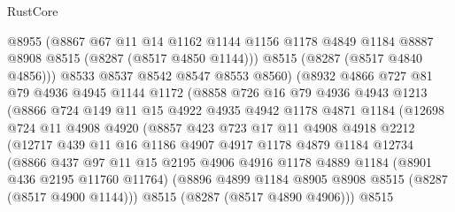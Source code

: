 \begin{lexlean}{RustCore}
\begin{coremodule}
                  @8955
                  (@8867
                    @67
                    @11
                    @14
                    @1162
                    @1144
                    @1156
                    @1178
                    @4849
                    @1184
                    @8887
                    @8908
                    @8515
                    (@8287 (@8517 @4850 @1144)))
                  @8515
                  (@8287 (@8517 @4840 @4856)))
                @8533
                @8537
                @8542
                @8547
                @8553
                @8560)
              (@8932
                @4866
                @727
                @81
                @79
                @4936
                @4945
                @1144
                @1172
                (@8858
                  @726
                  @16
                  @79
                  @4936
                  @4943
                  @1213
                  (@8866
                    @724
                    @149
                    @11
                    @15
                    @4922
                    @4935
                    @4942
                    @1178
                    @4871
                    @1184
                    (@12698
                      @724
                      @11
                      @4908
                      @4920
                      (@8857
                        @423
                        @723
                        @17
                        @11
                        @4908
                        @4918
                        @2212
                        (@12717
                          @439
                          @11
                          @16
                          @1186
                          @4907
                          @4917
                          @1178
                          @4879
                          @1184
                          @12734
                          (@8866
                            @437
                            @97
                            @11
                            @15
                            @2195
                            @4906
                            @4916
                            @1178
                            @4889
                            @1184
                            (@8901 @436 @2195 @11760 @11764)
                            (@8896 @4899 @1184 @8905 @8908 @8515 (@8287 (@8517 @4900 @1144)))
                            @8515
                            (@8287 (@8517 @4890 @4906)))
                          @8515

\end{coremodule}
\end{lexlean}
